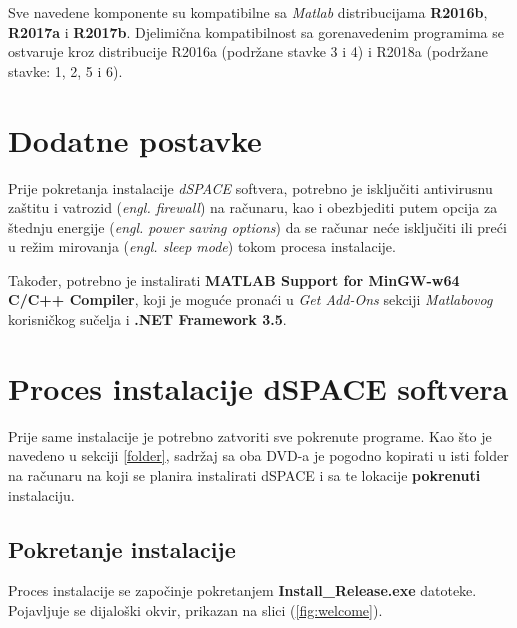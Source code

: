 Sve navedene komponente su kompatibilne sa \textit{Matlab} distribucijama \textbf{R2016b}, \textbf{R2017a} i \textbf{R2017b}. Djelimična kompatibilnost sa gorenavedenim programima se ostvaruje kroz distribucije R2016a (podržane stavke 3 i 4) i R2018a (podržane stavke: 1, 2, 5 i 6).

\section{Dodatne postavke}

\qquad Prije pokretanja instalacije \textit{dSPACE} softvera, potrebno je isključiti antivirusnu zaštitu i vatrozid (\textit{engl. firewall}) na računaru, kao i obezbjediti putem opcija za štednju energije (\textit{engl. power saving options}) da se računar neće isključiti ili preći u režim mirovanja (\textit{engl. sleep mode}) tokom procesa instalacije.

Također, potrebno je instalirati \textbf{MATLAB Support for MinGW-w64 C/C++ Compiler}, koji je moguće pronaći u \textit{Get Add-Ons} sekciji \textit{Matlabovog} korisničkog sučelja i \textbf{.NET Framework 3.5}.

\section{Proces instalacije dSPACE softvera}

\qquad Prije same instalacije je potrebno zatvoriti sve pokrenute programe. Kao što je navedeno u sekciji \ref{folder}, sadržaj sa oba DVD-a je pogodno kopirati u isti folder na računaru na koji se planira instalirati dSPACE i sa te lokacije \textbf{pokrenuti} instalaciju.

\subsection{Pokretanje instalacije}\label{pokretanje.instalacije}

\qquad Proces instalacije se započinje pokretanjem \textbf{Install\_Release.exe} datoteke. Pojavljuje se dijaloški okvir, prikazan na slici (\ref{fig:welcome}).

